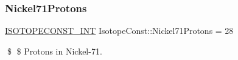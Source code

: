 \subsubsection{\texorpdfstring{Nickel71\+Protons}{Nickel71Protons}}
{\footnotesize\ttfamily \mbox{\hyperlink{group___isotope_const-_macros_ga5f18360b3e99483a35c32d789e62621c}{I\+S\+O\+T\+O\+P\+E\+C\+O\+N\+S\+T\+\_\+\+I\+NT}} Isotope\+Const\+::\+Nickel71\+Protons = 28}

\$ \$ Protons in Nickel-\/71. 